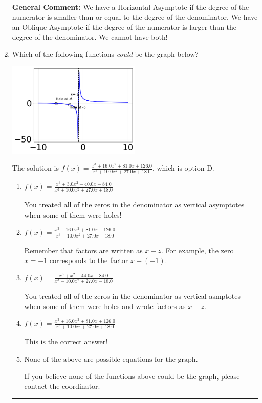 \documentclass{extbook}[14pt]
\newcommand{\litem}[1]{\item #1

\rule{\textwidth}{0.4pt}}
\begin{document}
\begin{enumerate}
{\textbf{General Comment:} We have a Horizontal Asymptote if the degree of the numerator is smaller than or equal to the degree of the denominator. We have an Oblique Asymptote if the degree of the numerator is larger than the degree of the denominator. We cannot have both!
}
\litem{
Which of the following functions \textit{could} be the graph below?

\begin{center}
    \includegraphics[width=0.5\textwidth]{../Figures/identifyGraphOfRationalFunctionA.png}
\end{center}


The solution is \( f(x)=\frac{x^{3} +16.0 x^{2} +81.0 x + 126.0}{x^{3} +10.0 x^{2} +27.0 x + 18.0} \), which is option D.\begin{enumerate}[label=\Alph*.]
\item \( f(x)=\frac{x^{3} +3.0 x^{2} -40.0 x -84.0}{x^{3} +10.0 x^{2} +27.0 x + 18.0} \)

You treated all of the zeros in the denominator as vertical asymptotes when some of them were holes!
\item \( f(x)=\frac{x^{3} -16.0 x^{2} +81.0 x -126.0}{x^{3} -10.0 x^{2} +27.0 x -18.0} \)

Remember that factors are written as $x-z$. For example, the zero $x=-1$ corresponds to the factor $x-(-1)$.
\item \( f(x)=\frac{x^{3} + x^{2} -44.0 x -84.0}{x^{3} -10.0 x^{2} +27.0 x -18.0} \)

You treated all of the zeros in the denominator as vertical asmptotes when some of them were holes and wrote factors as $x+z$.
\item \( f(x)=\frac{x^{3} +16.0 x^{2} +81.0 x + 126.0}{x^{3} +10.0 x^{2} +27.0 x + 18.0} \)

This is the correct answer!
\item \( \text{None of the above are possible equations for the graph.} \)

If you believe none of the functions above could be the graph, please contact the coordinator.
\end{enumerate}

}
\end{enumerate}
\end{document}
